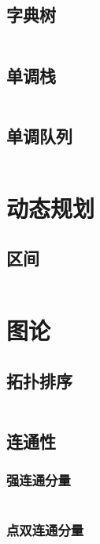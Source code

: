 \documentclass[a4paper,11pt]{article}
\begin{document}
\subsection{字典树}
\inputminted[linenos,autogobble]{java}{data-structure/trie.java}

\newpage
\subsection{单调栈}
\inputminted[linenos,autogobble]{java}{data-structure/monotone-stack.java}

\newpage
\subsection{单调队列}
\inputminted[linenos,autogobble]{java}{data-structure/monotone-queue.java}


\newpage
\section{动态规划}

\subsection{区间}
\inputminted[linenos,autogobble]{java}{dp/interval.java}


\newpage
\section{图论}

\subsection{拓扑排序}
\inputminted[linenos,autogobble]{java}{graph/topo.java}

\newpage
\subsection{连通性}
\subsubsection{强连通分量}
\inputminted[linenos,autogobble]{java}{graph/tarjan-s.java}

\subsubsection{点双连通分量}
\inputminted[linenos,autogobble]{java}{graph/tarjan-bv.java}
\end{document}
